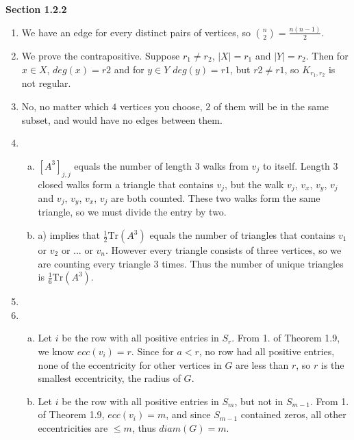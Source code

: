 \documentclass[11pt]{article}
\begin{document}
{\bfseries Section 1.2.2}

\begin{enumerate}[1]
    \item %
        We have an edge for every distinct pairs of vertices, so
        $\binom{n}{2} = \frac{n(n-1)}{2}$.
    \item %
        We prove the contrapositive. Suppose $r_1 \neq r_2$, $|X| = r_1$ and 
        $|Y| = r_2$. Then for $x \in X$, $deg(x) = r2$ and for $y \in Y$ 
        $deg(y) = r1$, but $r2 \neq r1$, so $K_{r_1, r_2}$ is not regular.
    \item %
        No, no matter which $4$ vertices you choose, $2$ of them will be in the 
        same subset, and would have no edges between them. 
    \item %
        \begin{enumerate}[a)]
            \item
                $[A^3]_{j,j}$ equals the number of length $3$ walks from $v_j$ to 
                itself. Length $3$ closed walks form a triangle that contains 
                $v_j$, but the walk $v_j$, $v_x$, $v_y$, $v_j$ and 
                $v_j$, $v_y$, $v_x$, $v_j$ are both counted. These two walks form the 
                same triangle, so we must divide the entry by two. 
            \item
                a) implies that $\frac{1}{2}\text{Tr}(A^3)$ equals the number of 
                triangles that contains $v_1$ or $v_2$ or ... or $v_n$. However 
                every triangle consists of three vertices, so we are counting 
                every triangle 3 times. Thus the number of unique triangles is 
                $\frac{1}{6}\text{Tr}(A^3)$.
        \end{enumerate}
    \item %

    \item %
        \begin{enumerate}[a)]
            \item
                Let $i$ be the row with all positive entries in $S_r$. 
                From 1. of Theorem 1.9, we know $ecc(v_i) = r$. Since for $a < r$,
                no row had all positive entries, none of the eccentricity for other
                vertices in $G$ are less than $r$, so $r$ is the smallest 
                eccentricity, the radius of $G$. 
            \item
                Let $i$ be the row with all positive entries in $S_m$, but not in
                $S_{m - 1}$. From 1. of Theorem 1.9, $ecc(v_i) = m$, and since 
                $S_{m-1}$ contained zeros, all other eccentricities are $ \leq m$,
                thus $diam(G) = m$. 
        \end{enumerate}


\end{enumerate}
\end{document}
